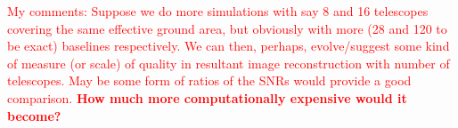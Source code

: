 \textcolor{red}{My comments: Suppose we do more simulations with say 8 and 16 telescopes covering the same effective ground area, but obviously with more (28 and 120 to be exact) baselines respectively. We can then, perhaps, evolve/suggest some kind of measure (or scale) of quality in resultant image reconstruction with number of telescopes. May be some form of ratios of the SNRs would provide a good comparison. {\bf How much more computationally expensive would it become?}}
